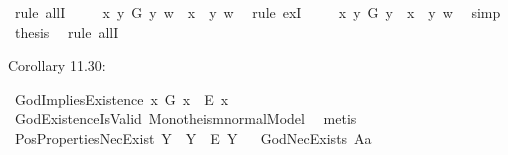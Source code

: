 \begin{isabellebody}
\ {\isacharparenleft}rule\ allI{\isacharparenright}\ \isanewline
\ \ \isamarkupfalse%
\ {\isachardoublequoteopen}{\isasymexists}x{\isachardot}\ {\isacharparenleft}{\isasymforall}y{\isachardot}\ G\ y\ w\ {\isasymlongleftrightarrow}\ {\isacharparenleft}x\ \isactrlbold {\isasymapprox}\ y{\isacharparenright}\ w{\isacharparenright}{\isachardoublequoteclose}\ \isamarkupfalse%
\ {\isacharparenleft}rule\ exI{\isacharparenright}\ \isanewline
\ \ \isamarkupfalse%
\ {\isachardoublequoteopen}{\isacharparenleft}\isactrlbold {\isasymexists}x{\isachardot}\ {\isacharparenleft}\isactrlbold {\isasymforall}y{\isachardot}\ G\ y\ \isactrlbold {\isasymleftrightarrow}\ {\isacharparenleft}x\ \isactrlbold {\isasymapprox}\ y{\isacharparenright}{\isacharparenright}{\isacharparenright}\ w{\isachardoublequoteclose}\ \isamarkupfalse%
\ simp\isanewline
\isacommand{{\isacharbraceright}}\isamarkupfalse%
\isanewline
{}\isamarkupfalse%
\ {\isacharquery}thesis\ \isamarkupfalse%
\ {\isacharparenleft}rule\ allI{\isacharparenright}\ \isanewline
{}\isamarkupfalse%
%
\endisatagproof
{\isafoldproof}%
%
\isadelimproof
%
\endisadelimproof
%
\begin{isamarkuptext}%
\bigbreak%
\end{isamarkuptext}\isamarkuptrue%
%
\begin{isamarkuptext}%
Corollary 11.30:%
\end{isamarkuptext}\isamarkuptrue%
\isamarkupfalse%
\ GodImpliesExistence{\isacharcolon}\ {\isachardoublequoteopen}{\isasymlfloor}\isactrlbold {\isasymforall}x{\isachardot}\ G\ x\ \isactrlbold {\isasymrightarrow}\ E{\isacharbang}\ x{\isasymrfloor}{\isachardoublequoteclose}\ \isanewline
%
\isadelimproof
\ \ %
\endisadelimproof
%
\isatagproof
{}\isamarkupfalse%
\ GodExistenceIsValid\ Monotheism{\isacharunderscore}normalModel\ \isamarkupfalse%
\ metis%
\endisatagproof
{\isafoldproof}%
%
\isadelimproof
%
\endisadelimproof
%
\isamarkuptrue%
\isamarkupfalse%
\ PosPropertiesNecExist{\isacharcolon}\ {\isachardoublequoteopen}{\isasymlfloor}\isactrlbold {\isasymforall}Y{\isachardot}\ {\isasymP}\ Y\ \isactrlbold {\isasymrightarrow}\ \isactrlbold {\isasymbox}\isactrlbold {\isasymexists}\isactrlsup E\ Y{\isasymrfloor}{\isachardoublequoteclose}%
\isadelimproof
\ %
\endisadelimproof
%
\isatagproof
{}\isamarkupfalse%
\ GodNecExists\ A{}a\isanewline

\end{isabellebody}
